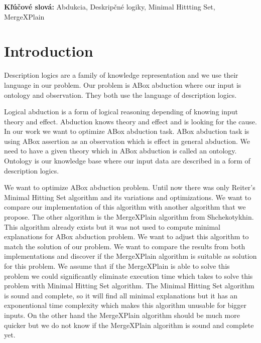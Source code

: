 \documentclass[12pt,a4paper]{article}
\begin{document}
\noindent \textbf{Kľúčové slová:}
Abdukcia, Deskripčné logiky, Minimal Hittting Set, MergeXPlain

\pagebreak
\thispagestyle{empty}
\tableofcontents
\thispagestyle{empty}

\pagebreak
\thispagestyle{empty}
\listoffigures

\pagebreak
\setcounter{page}{1}
\section*{Introduction}
Description logics are a family of knowledge representation and we use their language in our problem. Our problem is ABox abduction where our input is ontology and observation. They both use the language of description logics.

Logical abduction is a form of logical reasoning depending of knowing input theory and effect. Abduction knows theory and effect and is looking for the cause. In our work we want to optimize ABox abduction task. ABox abduction task is using ABox assertion as an observation which is effect in general abduction. We need to have a given theory which in ABox abduction is called an ontology. Ontology is our knowledge base where our input data are described in a form of description logics.

We want to optimize ABox abduction problem. Until now there was only Reiter's Minimal Hitting Set algorithm and its variations and optimizations. We want to compare our implementation of this algorithm with another algorithm that we propose. The other algorithm is the MergeXPlain algorithm from Shchekotykhin. This algorithm already exists but it was not used to compute minimal explanations for ABox abduction problem. We want to adjust this algorithm to match the solution of our problem. We want to compare the results from both implementations and discover if the MergeXPlain algorithm is suitable as solution for this problem. We assume that if the MergeXPlain is able to solve this problem we could significantly eliminate execution time which takes to solve this problem with Minimal Hitting Set algorithm. The Minimal Hitting Set algorithm is sound and complete, so it will find all minimal explanations but it has an exponentional time complexity which makes this algorithm unusable for bigger inputs. On the other hand the MergeXPlain algorithm should be much more quicker but we do not know if the MergeXPlain algorithm is sound and complete yet. 
\end{document}
